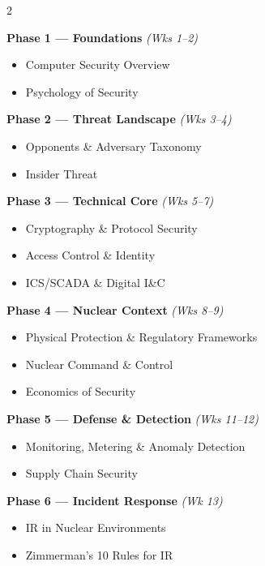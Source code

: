 \documentclass[9pt]{extarticle}
\begin{document}
\begin{multicols}{2}

\textbf{Phase 1 --- Foundations} \textit{(Wks 1--2)}
\begin{itemize}
    \item Computer Security Overview
    \item Psychology of Security
\end{itemize}

\medskip

\textbf{Phase 2 --- Threat Landscape} \textit{(Wks 3--4)}
\begin{itemize}
    \item Opponents \& Adversary Taxonomy
    \item Insider Threat
\end{itemize}

\medskip

\textbf{Phase 3 --- Technical Core} \textit{(Wks 5--7)}
\begin{itemize}
    \item Cryptography \& Protocol Security
    \item Access Control \& Identity
    \item ICS/SCADA \& Digital I\&C
\end{itemize}

\medskip

\textbf{Phase 4 --- Nuclear Context} \textit{(Wks 8--9)}
\begin{itemize}
    \item Physical Protection \& Regulatory Frameworks
    \item Nuclear Command \& Control
    \item Economics of Security
\end{itemize}

\columnbreak

{\setlength{\leftskip}{1.5em}
\textbf{Phase 5 --- Defense \& Detection} \textit{(Wks 11--12)}
\begin{itemize}
    \item Monitoring, Metering \& Anomaly Detection
    \item Supply Chain Security
\end{itemize}

\medskip

\textbf{Phase 6 --- Incident Response} \textit{(Wk 13)}
\begin{itemize}
    \item IR in Nuclear Environments
    \item Zimmerman's 10 Rules for IR
\end{itemize}

}
\end{multicols}
\end{document}
